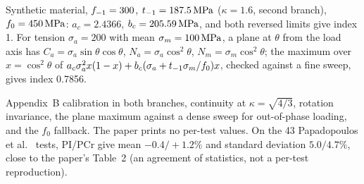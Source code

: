  Synthetic material, $f_{-1}=300$, $t_{-1}=187.5\,\mathrm{MPa}$ ($\kappa=1.6$, second branch),
$f_0=450\,\mathrm{MPa}$: $a_c=2.4366$, $b_c=205.59\,\mathrm{MPa}$, and both reversed limits give index 1. For tension
$\sigma_a=200$ with mean $\sigma_m=100\,\mathrm{MPa}$, a plane at $\theta$ from the load axis has
$C_a=\sigma_a\sin\theta\cos\theta$, $N_a=\sigma_a\cos^2\theta$, $N_m=\sigma_m\cos^2\theta$; the
maximum over $x=\cos^2\theta$ of $a_c\sigma_a^2x(1-x)+b_c(\sigma_a+t_{-1}\sigma_m/f_0)x$, checked against a
fine sweep, gives index 0.7856.

 Appendix~B calibration in both branches, continuity at $\kappa=\sqrt{4/3}$,
rotation invariance, the plane maximum against a dense sweep for out-of-phase loading, and the $f_0$
fallback. The paper prints no per-test values. On the 43 Papadopoulos et al.\ \cite{papadopoulos1997}
tests, PI/PCr give mean $-0.4/+1.2\%$ and standard deviation $5.0/4.7\%$, close to the paper's Table~2
(an agreement of statistics, not a per-test reproduction).
